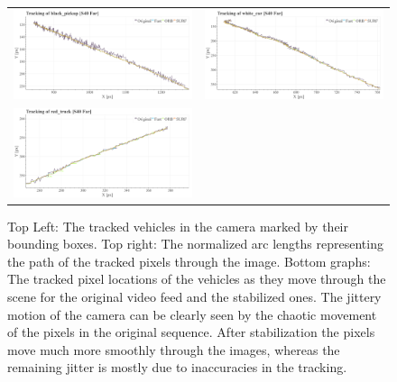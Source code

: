 \begin{figure}[!ht]
\begin{tabular}{cc}
    \includegraphics[width=0.475\linewidth]{diagrams/object_tracking/s40_n_far/black_pickup.png}    &  
    \includegraphics[width=0.475\linewidth]{diagrams/object_tracking/s40_n_far/white_car.png}    \\  
    \includegraphics[width=0.475\linewidth]{diagrams/object_tracking/s40_n_far/red_truck.png}   
  \end{tabular}
  \caption{Top Left:
  The tracked vehicles in the camera  marked by their bounding boxes. 
  Top right: 
  The normalized arc lengths representing the path of the tracked pixels through the image.
  Bottom graphs:
  The tracked pixel locations of the vehicles as they move through the scene for the original video feed and the stabilized ones.
  The jittery motion of the camera can be clearly seen by the chaotic movement of the pixels in the original sequence.
  After stabilization the pixels move much more smoothly through the images, whereas the remaining jitter is mostly due to inaccuracies in the tracking. 
  }
  \label{fig:object_tracking_appendix_s40_n_far}
\end{figure}



